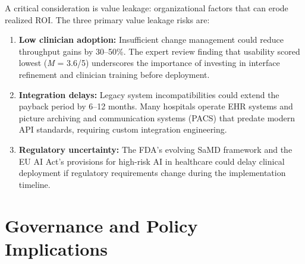 A critical consideration is value leakage: organizational factors that can erode realized ROI. The three primary value leakage risks are:

\begin{enumerate}
    \item \textbf{Low clinician adoption:} Insufficient change management could reduce throughput gains by 30--50\%. The expert review finding that usability scored lowest (\textit{M} = 3.6/5) underscores the importance of investing in interface refinement and clinician training before deployment.

    \item \textbf{Integration delays:} Legacy system incompatibilities could extend the payback period by 6--12 months. Many hospitals operate EHR systems and picture archiving and communication systems (PACS) that predate modern API standards, requiring custom integration engineering.

    \item \textbf{Regulatory uncertainty:} The FDA's evolving SaMD framework \cite{fda2021aiml} and the EU AI Act's provisions for high-risk AI in healthcare \cite{eu2021aiact} could delay clinical deployment if regulatory requirements change during the implementation timeline.
\end{enumerate}

\section{Governance and Policy Implications}
\label{app_j:governance}

